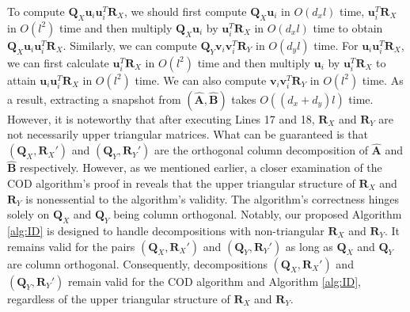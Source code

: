  To compute $\boldsymbol{Q}_X\boldsymbol{u}_i\boldsymbol{u}_i^T\boldsymbol{R}_X$, we should first compute $\boldsymbol{Q}_X\boldsymbol{u}_i$ in $O(d_xl)$ time, $\boldsymbol{u}_i^T\boldsymbol{R}_X$ in $O(l^2)$ time and then multiply $\boldsymbol{Q}_X\boldsymbol{u}_i$ by $\boldsymbol{u}_i^T\boldsymbol{R}_X$ in $O(d_xl)$ time to obtain $\boldsymbol{Q}_X\boldsymbol{u}_i\boldsymbol{u}_i^T\boldsymbol{R}_X$. Similarly, we can compute $\boldsymbol{Q}_Y\boldsymbol{v}_i\boldsymbol{v}_i^T\boldsymbol{R}_Y$ in $O(d_yl)$ time. For $\boldsymbol{u}_i\boldsymbol{u}_i^T\boldsymbol{R}_X$, we can first calculate $\boldsymbol{u}_i^T\boldsymbol{R}_X$ in $O(l^2)$ time and then multiply $\boldsymbol{u}_i$ by $\boldsymbol{u}_i^T\boldsymbol{R}_X$ to attain $\boldsymbol{u}_i\boldsymbol{u}_i^T\boldsymbol{R}_X$ in $O(l^2)$ time. We can also compute $\boldsymbol{v}_i\boldsymbol{v}_i^T\boldsymbol{R}_Y$ in $O(l^2)$ time. As a result, extracting a snapshot from $(\hat{\boldsymbol{A}},\hat{\boldsymbol{B}})$ takes $O((d_x+d_y)l)$ time. However, it is noteworthy that after executing Lines 17 and 18, $\boldsymbol{R}_X$ and $\boldsymbol{R}_Y$ are not necessarily upper triangular matrices. What can be guaranteed is that $(\boldsymbol{Q}_X,\boldsymbol{R}_X')$ and $(\boldsymbol{Q}_Y,\boldsymbol{R}_Y')$ are the orthogonal column decomposition of $\hat{\boldsymbol{A}}$ and $\hat{\boldsymbol{B}}$ respectively. However, as we mentioned earlier, a closer examination of the COD algorithm's proof in \cite{MrouehMG17} reveals that the upper triangular structure of $\boldsymbol{R}_X$ and $\boldsymbol{R}_Y$ is nonessential to the algorithm's validity. The algorithm's correctness hinges solely on $\boldsymbol{Q}_X$ and $\boldsymbol{Q}_Y$ being column orthogonal. Notably, our proposed Algorithm \ref{alg:ID} is designed to handle decompositions with non-triangular $\boldsymbol{R}_X$ and $\boldsymbol{R}_Y$. It remains valid for the pairs $(\boldsymbol{Q}_X,\boldsymbol{R}_X')$ and $(\boldsymbol{Q}_Y,\boldsymbol{R}_Y')$ as long as $\boldsymbol{Q}_X$ and $\boldsymbol{Q}_Y$ are column orthogonal. Consequently, decompositions $(\boldsymbol{Q}_X,\boldsymbol{R}_X')$ and $(\boldsymbol{Q}_Y,\boldsymbol{R}_Y')$ remain valid for the COD algorithm and Algorithm \ref{alg:ID}, regardless of the upper triangular structure of $\boldsymbol{R}_X$ and $\boldsymbol{R}_Y$.



